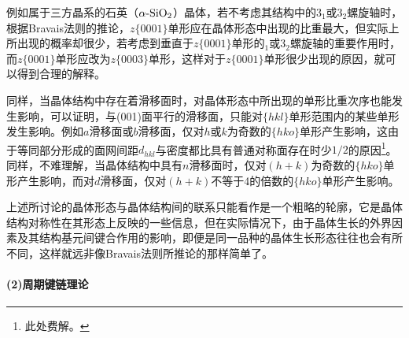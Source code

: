 例如属于三方晶系的石英（$\alpha\text{-}\rm SiO_2$）晶体，若不考虑其结构中的$3_1$或$3_2$螺旋轴时，根据Bravais法则的推论，$z\{0001\}$单形应在晶体形态中出现的比重最大，但实际上所出现的概率却很少，若考虑到垂直于$z\{0001\}$单形的$_1$或$3_2$螺旋轴的重要作用时，而$z\{0001\}$单形应改为$z\{0003\}$单形，这样对于$z\{0001\}$单形很少出现的原因，就可以得到合理的解释。

同样，当晶体结构中存在着滑移面时，对晶体形态中所出现的单形比重次序也能发生影响，可以证明，与(001)面平行的滑移面，只能对$\{hkl\}$单形范围内的某些单形发生影响。例如$a$滑移面或$b$滑移面，仅对$h$或$k$为奇数的$\{hko\}$单形产生影响，这由于等同部分形成的面网间距$d_{hkl}$与密度都比具有普通对称面存在时少$1/2$的原因\footnote{此处费解。}。同样，不难理解，当晶体结构中具有$n$滑移面时，仅对$(h+k)$为奇数的$\{hko\}$单形产生影响，而对$d$滑移面，仅对$(h+k)$不等于4的倍数的$\{hko\}$单形产生影响。

上述所讨论的晶体形态与晶体结构间的联系只能看作是一个粗略的轮廓，它是晶体结构对称性在其形态上反映的一些信息，但在实际情况下，由于晶体生长的外界因素及其结构基元间键合作用的影响，即便是同一品种的晶体生长形态往往也会有所不同，这样就远非像Bravais法则所推论的那样简单了。

\paragraph{(2)周期键链理论}
